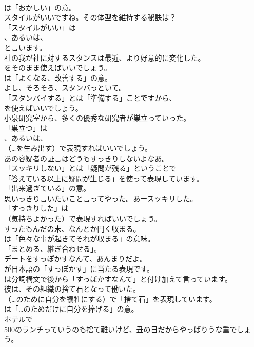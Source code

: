 \documentclass[8pt]{extreport}
\begin{document}
\begin{CJK}{UTF8}{min}
\\	は「おかしい」の意。	
\\	スタイルがいいですね。その体型を維持する秘訣は？ 
\\	「スタイルがいい」は 
\\	、あるいは、
\\	と言います。	
\\	社の我が社に対するスタンスは最近、より好意的に変化した。 
\\	をそのまま使えばいいでしょう。
\\	は「よくなる、改善する」の意。	
\\	よし、そろそろ、スタンバっといて。 
\\	「スタンバイする」とは「準備する」ことですから、
\\	を使えばいいでしょう。	
\\	小泉研究室から、多くの優秀な研究者が巣立っていった。 
\\	「巣立つ」は 
\\	、あるいは、
\\	（…を生み出す）で表現すればいいでしょう。	
\\	あの容疑者の証言はどうもすっきりしないよなあ。 
\\	「スッキリしない」とは「疑問が残る」ということで
\\	「答えている以上に疑問が生じる」を使って表現しています。
\\	「出来過ぎている」の意。	
\\	思いっきり言いたいこと言ってやった。あースッキリした。 
\\	「すっきりした」は 
\\	（気持ちよかった）で表現すればいいでしょう。	
\\	すったもんだの末、なんとか円く収まる。 
\\	は「色々な事が起きてそれが収まる」の意味。
\\	「まとめる、継ぎ合わせる」。	
\\	デートをすっぽかすなんて、あんまりだよ。 
\\	が日本語の「すっぽかす」に当たる表現です。
\\	は分詞構文で後から「すっぽかすなんて」と付け加えて言っています。	
\\	彼は、その組織の捨て石となって働いた。 
\\	（…のために自分を犠牲にする）で「捨て石」を表現しています。
\\	は「…のためだけに自分を捧げる」の意。	
\\	ホテルで
\\	500のランチっていうのも捨て難いけど、丑の日だからやっぱりうな重でしょう。 

\end{CJK}
\end{document}
